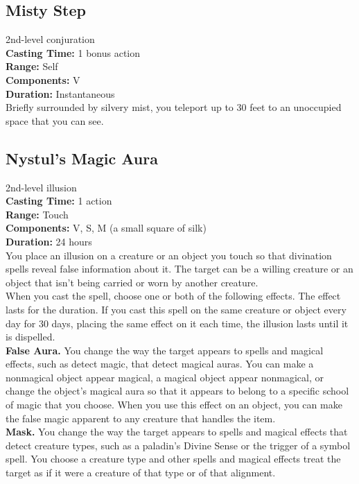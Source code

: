 \documentclass[11pt, A4paper, english]{article}
\begin{document}
		\subsection{Misty Step}
2nd-level conjuration \\
\textbf{Casting Time:} 1 bonus action \\
\textbf{Range:} Self \\
\textbf{Components:} V \\
\textbf{Duration:} Instantaneous \\
Briefly surrounded by silvery mist, you teleport up to 30 feet to an unoccupied space that you can see.

		\subsection{Nystul's Magic Aura}
2nd-level illusion \\
\textbf{Casting Time:} 1 action \\
\textbf{Range:} Touch \\
\textbf{Components:} V, S, M (a small square of silk) \\
\textbf{Duration:} 24 hours \\
You place an illusion on a creature or an object you touch so that divination spells reveal false information about it. The target can be a willing creature or an object that isn't being carried or worn by another creature. \\
When you cast the spell, choose one or both of the following effects. The effect lasts for the duration. If you cast this spell on the same creature or object every day for 30 days, placing the same effect on it each time, the illusion lasts until it is dispelled. \\
\textbf{False Aura.} You change the way the target appears to spells and magical effects, such as detect magic, that detect magical auras. You can make a nonmagical object appear magical, a magical object appear nonmagical, or change the object's magical aura so that it appears to belong to a specific school of magic that you choose. When you use this effect on an object, you can make the false magic apparent to any creature that handles the item. \\
\textbf{Mask.} You change the way the target appears to spells and magical effects that detect creature types, such as a paladin's Divine Sense or the trigger of a symbol spell. You choose a creature type and other spells and magical effects treat the target as if it were a creature of that type or of that alignment.
\end{document}
